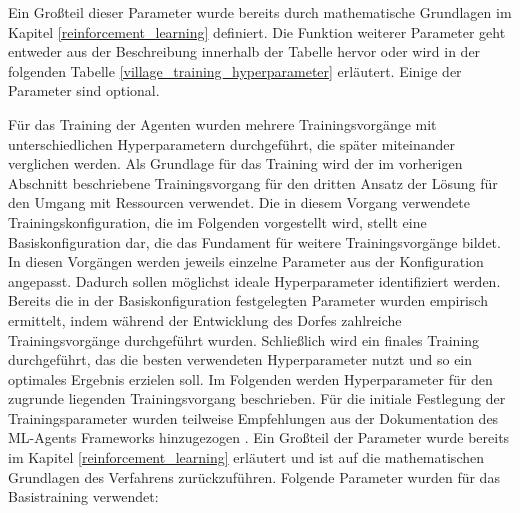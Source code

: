 Ein Großteil dieser Parameter wurde bereits durch mathematische Grundlagen im Kapitel \ref{reinforcement_learning}  definiert. Die Funktion weiterer Parameter geht entweder aus der Beschreibung innerhalb der Tabelle hervor oder wird in der folgenden Tabelle \ref{village_training_hyperparameter} erläutert. Einige der Parameter sind optional.


Für das Training der Agenten wurden mehrere Trainingsvorgänge mit unterschiedlichen Hyperparametern durchgeführt, die später miteinander verglichen werden. Als Grundlage für das Training wird der im vorherigen Abschnitt beschriebene Trainingsvorgang für den dritten Ansatz der Lösung für den Umgang mit Ressourcen verwendet. Die in diesem Vorgang verwendete Trainingskonfiguration, die im Folgenden vorgestellt wird, stellt eine Basiskonfiguration dar, die das Fundament für weitere Trainingsvorgänge bildet. In diesen Vorgängen werden jeweils einzelne Parameter aus der Konfiguration angepasst. Dadurch sollen möglichst ideale Hyperparameter identifiziert werden. Bereits die in der Basiskonfiguration festgelegten Parameter wurden empirisch ermittelt, indem während der Entwicklung des Dorfes zahlreiche Trainingsvorgänge durchgeführt wurden.
Schließlich wird ein finales Training durchgeführt, das die besten verwendeten Hyperparameter nutzt und so ein optimales Ergebnis erzielen soll. Im Folgenden werden Hyperparameter für den zugrunde liegenden Trainingsvorgang beschrieben. Für die initiale Festlegung der Trainingsparameter wurden teilweise Empfehlungen aus der Dokumentation des ML-Agents Frameworks hinzugezogen \cite{ml-agents_documentation_hyperparameter_ppo}. Ein Großteil der Parameter wurde bereits im Kapitel \ref{reinforcement_learning} erläutert und ist auf die mathematischen Grundlagen des Verfahrens zurückzuführen. Folgende Parameter wurden für das Basistraining verwendet:

